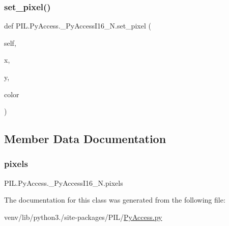 \subsubsection{\texorpdfstring{set\+\_\+pixel()}{set\_pixel()}}
{\footnotesize\ttfamily def P\+I\+L.\+Py\+Access.\+\_\+\+Py\+Access\+I16\+\_\+\+N.\+set\+\_\+pixel (\begin{DoxyParamCaption}\item[{}]{self,  }\item[{}]{x,  }\item[{}]{y,  }\item[{}]{color }\end{DoxyParamCaption})}



\subsection{Member Data Documentation}
\mbox{\label{classPIL_1_1PyAccess_1_1__PyAccessI16__N_ae9241a3b40cbef718a7bbf85fc29e4c8}} 
\subsubsection{\texorpdfstring{pixels}{pixels}}
{\footnotesize\ttfamily P\+I\+L.\+Py\+Access.\+\_\+\+Py\+Access\+I16\+\_\+\+N.\+pixels}



The documentation for this class was generated from the following file\+:\begin{DoxyCompactItemize}
\item 
venv/lib/python3./site-\/packages/\+P\+I\+L/\hyperlink{PyAccess_8py}{Py\+Access.\+py}\end{DoxyCompactItemize}
